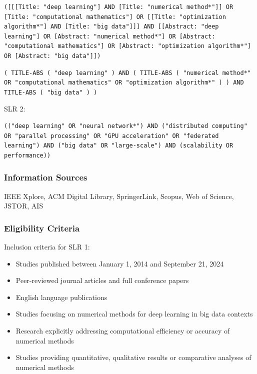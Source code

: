 \documentclass[acmsmall]{acmart}
\begin{document}
\begin{lstlisting}[caption={ACM Search String},label={lst:acm}]
    ([[[Title: "deep learning"] AND [Title: "numerical method*"]] OR [Title: "computational mathematics"] OR [[Title: "optimization algorithm*"] AND [Title: "big data"]]] AND [[Abstract: "deep learning"] OR [Abstract: "numerical method*"] OR [Abstract: "computational mathematics"] OR [Abstract: "optimization algorithm*"] OR [Abstract: "big data"]])
\end{lstlisting}

\begin{lstlisting}[caption={Springer Search String},label={lst:springer}]
    ( TITLE-ABS ( "deep learning" ) AND ( TITLE-ABS ( "numerical method*" OR "computational mathematics" OR "optimization algorithm*" ) ) AND TITLE-ABS ( "big data" ) )
\end{lstlisting}

SLR 2:
\begin{lstlisting}[caption={SLR 2},label={lst:slr_2}]
    (("deep learning" OR "neural network*") AND ("distributed computing" OR "parallel processing" OR "GPU acceleration" OR "federated learning") AND ("big data" OR "large-scale") AND (scalability OR performance))
\end{lstlisting}

\subsubsection{Information Sources}\label{subsubsec:phase-1-planning-and-protocol-development:information-sources}
IEEE Xplore, ACM Digital Library, SpringerLink, Scopus, Web of Science, JSTOR, AIS

\subsubsection{Eligibility Criteria}\label{subsubsec:phase-1-planning-and-protocol-development:eligibility-criteria}
Inclusion criteria for SLR 1:
\begin{itemize}
    \item Studies published between January 1, 2014 and September 21, 2024
    \item Peer-reviewed journal articles and full conference papers
    \item English language publications
    \item Studies focusing on numerical methods for deep learning in big data contexts
    \item Research explicitly addressing computational efficiency or accuracy of numerical methods
    \item Studies providing quantitative, qualitative results or comparative analyses of numerical methods
\end{itemize}
\end{document}
